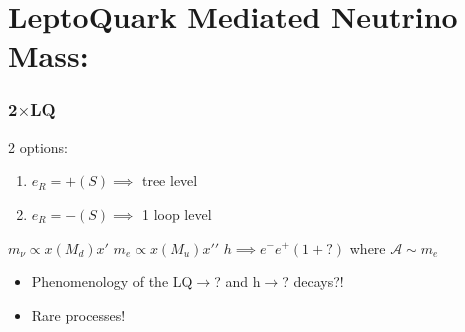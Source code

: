 \documentclass[10pt,letterpaper,oneside]{article}
\begin{document}
\part{LeptoQuark Mediated Neutrino Mass:}
\section{2$\times$LQ}
2 options: \begin{enumerate}
\item $e_R = + (S) \implies$ tree level
\item $e_R = - (S) \implies$ 1 loop level
\end{enumerate}
\Large
\centering
$m_{\nu}\propto x \left(M_d\right) x\prime$ \quad
$m_{e}\propto x \left(M_u\right) x\prime \prime$ \quad
$h \implies e^- e^+ \left(1+?\right)$ where $\mathcal{A}\sim m_e$ \\
\normalsize
\begin{itemize}
\item Phenomenology of the LQ$\rightarrow$? and h$\rightarrow$? decays?!
\item Rare processes!
\end{itemize} 
\end{document}
